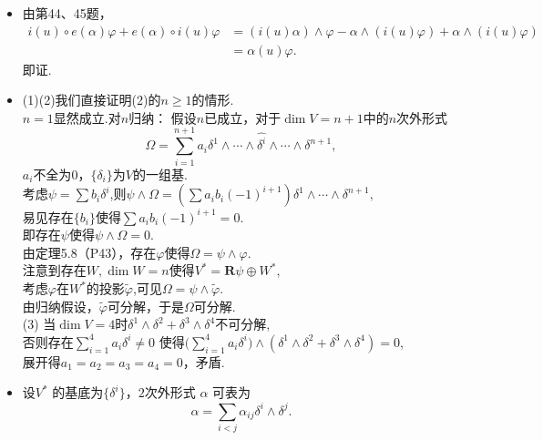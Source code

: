 \begin{itemize}
\begin{enumerate}
	
	
	
	\end{enumerate}
	
	
    \item[46.]
   由第44、45题，
   \begin{align*}
    i(u)\circ e(\alpha)\varphi+e(\alpha)\circ i(u)\varphi&=(i(u)\alpha)\wedge\varphi-\alpha\wedge(i(u)\varphi)+\alpha\wedge(i(u)\varphi)\\
    &=\alpha(u)\varphi.
    \end{align*}
    即证.

    \item[47.]
    (1)(2)我们直接证明(2)的$n\geq 1$的情形.\\
    $n=1$显然成立.对$n$归纳：
    假设$n$已成立，对于$\dim V=n+1$中的$n$次外形式
    $$\Omega=\sum\limits_{i=1}^{n+1}a_i\delta^1\wedge\cdots\wedge\hat{\delta^i}\wedge\cdots\wedge\delta^{n+1},$$
    $a_i$不全为$0$，$\{\delta_i\}$为$V$的一组基.\\
    考虑$\psi=\sum b_i\delta^i$,则$\psi\wedge\Omega=(\sum a_ib_i(-1)^{i+1})\delta^1\wedge\cdots\wedge\delta^{n+1},$\\
    易见存在$\{b_i\}$使得$\sum a_ib_i(-1)^{i+1}=0$.\\
    即存在$\psi$使得$\psi\wedge\Omega=0$.\\
    由定理5.8（P43），存在$\varphi$使得$\Omega=\psi\wedge\varphi$.\\
    注意到存在$W,\dim W=n$使得$V^*=\mathbf{R}\psi\oplus W^*$,\\
    考虑$\varphi$在$W^*$的投影$\tilde{\varphi}$,可见$\Omega=\psi\wedge\tilde{\varphi}$.\\
    由归纳假设，$\tilde{\varphi}$可分解，于是$\Omega$可分解.\\
    
    (3)
    当$\dim V=4$时$\delta^1\wedge\delta^2+\delta^3\wedge\delta^4$不可分解,\\
    否则存在$\sum\limits_{i=1}^4 a_i\delta^i\neq0$
    使得$\Big(\sum\limits_{i=1}^4 a_i\delta^i\Big)\wedge(\delta^1\wedge\delta^2+\delta^3\wedge\delta^4)=0$,\\
    展开得$a_1=a_2=a_3=a_4=0$，矛盾.

    \item[48.]
    设$V^* $ 的基底为$\{  \delta^i  \}$，$2$次外形式 $ \alpha $ 可表为\\
    $$ \alpha =  \sum _ {i<j} \alpha_{ij}\delta^i \wedge  \delta^j .$$
    

\end{itemize}
